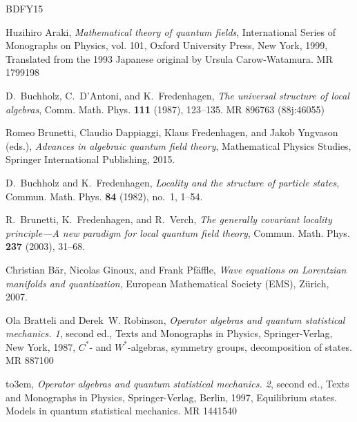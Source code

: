 \documentclass[12pt,a4paper]{article}
\newcommand{\1}{\mathds{1}}                         %
\begin{document}
\providecommand{\bysame}{\leavevmode\hbox to3em{\hrulefill}\thinspace}
\providecommand{\MR}{\relax\ifhmode\unskip\space\fi MR }
\providecommand{\MRhref}[2]{%
	\href{http://www.ams.org/mathscinet-getitem?mr=#1}{#2}
}
\providecommand{\href}[2]{#2}
\small{\begin{thebibliography}{BDFY15}
		
		Huzihiro Araki, \emph{Mathematical theory of quantum fields}, International
		Series of Monographs on Physics, vol. 101, Oxford University Press, New York,
		1999, Translated from the 1993 Japanese original by Ursula Carow-Watamura.
		\MR{1799198}
		
		D.~Buchholz, C.~D'Antoni, and K.~Fredenhagen, \emph{The universal structure of
			local algebras}, Comm. Math. Phys. \textbf{111} (1987), 123--135. \MR{896763
			(88j:46055)}
		
		Romeo Brunetti, Claudio Dappiaggi, Klaus Fredenhagen, and Jakob Yngvason
		(eds.), \emph{Advances in algebraic quantum field theory}, Mathematical
		Physics Studies, Springer International Publishing, 2015.
		
		D.~Buchholz and K.~Fredenhagen, \emph{Locality and the structure of particle
			states}, Commun. Math. Phys. \textbf{84} (1982), no.~1, 1--54.
		
		R.~Brunetti, K.~Fredenhagen, and R.~Verch, \emph{The generally covariant
			locality principle---{A} new paradigm for local quantum field theory},
		Commun. Math. Phys. \textbf{237} (2003), 31--68.
		
		Christian B{\"{a}}r, Nicolas Ginoux, and Frank Pf{\"{a}}ffle, \emph{Wave
			equations on {L}orentzian manifolds and quantization}, European Mathematical
		Society (EMS), Z{\"{u}}rich, 2007.
		
		Ola Bratteli and Derek~W. Robinson, \emph{Operator algebras and quantum
			statistical mechanics. 1}, second ed., Texts and Monographs in Physics,
		Springer-Verlag, New York, 1987, $C^\ast$- and $W^\ast$-algebras, symmetry
		groups, decomposition of states. \MR{887100}
		
		\bysame, \emph{Operator algebras and quantum statistical mechanics. 2}, second
		ed., Texts and Monographs in Physics, Springer-Verlag, Berlin, 1997,
		Equilibrium states. Models in quantum statistical mechanics. \MR{1441540}
		

\end{thebibliography}}
\end{document}

